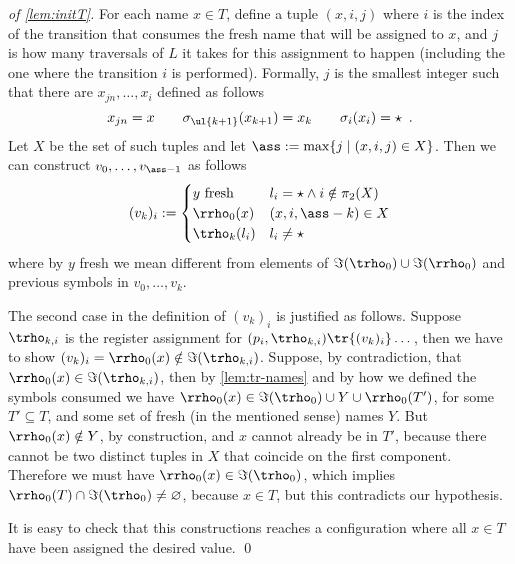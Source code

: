 \begin{proof}[of \cref{lem:initT}]
For each name $x \in T$, define a tuple $(x,i,j)$ where $i$ is the index of the transition that consumes the fresh name that will be assigned to $x$, and $j$ is how many traversals of $L$ it takes for this assignment to happen (including the one where the transition $i$ is performed). Formally, $j$ is the smallest integer such that there are $x_{jn},\dots,x_i$ defined as follows
\[
	x_{jn} = x \qquad \sigma_\ul{k+1}(x_{k+1}) = x_k \qquad \sigma_i(x_i) = \star \enspace .
\]
Let $X$ be the set of such tuples and let $\ass := \max \{ j \mid (x,i,j) \in X \}$. Then we can construct $v_0,\dots,v_{\ass-1}$ as follows
\[
	(v_k)_i :=
	\begin{cases}
		\text{$y$ fresh} & l_i = \star \land i \notin \pi_2(X) \\
		\rrho_0(x) & (x,i,\ass - k) \in X
		 \\
\trho_{k}(l_i) & l_i \neq \star
	\end{cases}
\]
where by $y$ fresh we mean different from elements of $\Im(\trho_0) \cup \Im(\rrho_0)$ and previous symbols in $v_0,\dots,v_{k}$.

The second case in the definition of $(v_k)_i$ is justified as follows. Suppose $\trho_{k,i}$ is the register assignment for $(p_i,\trho_{k,i}) \tr{(v_k)_i} \dots$, then we have to show $(v_k)_i = \rrho_0(x) \notin \Im(\trho_{k,i})$. Suppose, by contradiction, that $\rrho_0(x) \in \Im(\trho_{k,i})$, then by \cref{lem:tr-names} and by how we defined the symbols consumed we have $\rrho_0(x) \in \Im(\trho_0) \cup Y \cup \rrho_0(T')$, for some $T' \subseteq T$, and some set of fresh (in the mentioned sense) names $Y$.
But $\rrho_0(x) \notin Y$, by construction, and $x$ cannot already be in $T'$, because there cannot be two distinct tuples in $X$ that coincide on the first component. Therefore we must have
$\rrho_0(x) \in \Im(\trho_0)$, which implies $\rrho_0(T) \cap \Im(\trho_0) \neq \varnothing$, because $x \in T$, but this contradicts our hypothesis.


It is easy to check that this constructions reaches a configuration where all $x \in T$ have been assigned the desired value. 
\qed
\end{proof}